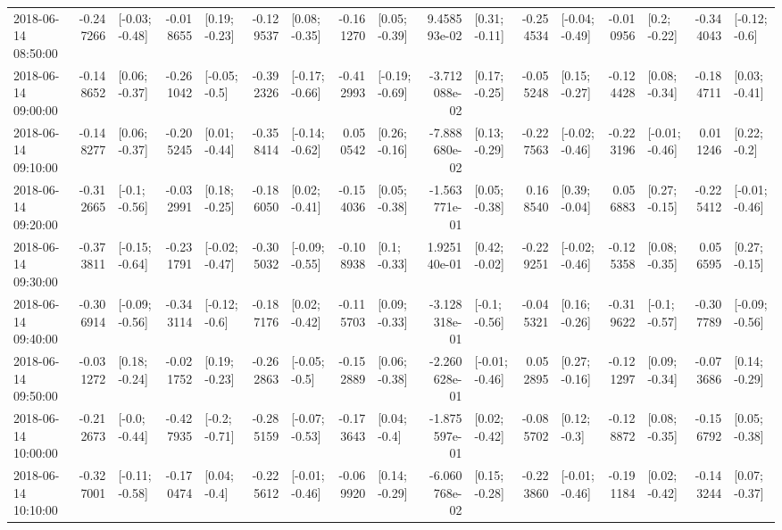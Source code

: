 \begin{tabular}{lrlrlrlrlrlrlrlrl}
2018-06-14 08:50:00 & -0.247266 &  [-0.03; -0.48] & -0.018655 &   [0.19; -0.23] & -0.129537 &   [0.08; -0.35] & -0.161270 &   [0.05; -0.39] &  9.458593e-02 &   [0.31; -0.11] & -0.254534 &  [-0.04; -0.49] & -0.010956 &    [0.2; -0.22] & -0.344043 &   [-0.12; -0.6] \\
2018-06-14 09:00:00 & -0.148652 &   [0.06; -0.37] & -0.261042 &   [-0.05; -0.5] & -0.392326 &  [-0.17; -0.66] & -0.412993 &  [-0.19; -0.69] & -3.712088e-02 &   [0.17; -0.25] & -0.055248 &   [0.15; -0.27] & -0.124428 &   [0.08; -0.34] & -0.184711 &   [0.03; -0.41] \\
2018-06-14 09:10:00 & -0.148277 &   [0.06; -0.37] & -0.205245 &   [0.01; -0.44] & -0.358414 &  [-0.14; -0.62] &  0.050542 &   [0.26; -0.16] & -7.888680e-02 &   [0.13; -0.29] & -0.227563 &  [-0.02; -0.46] & -0.223196 &  [-0.01; -0.46] &  0.011246 &    [0.22; -0.2] \\
2018-06-14 09:20:00 & -0.312665 &   [-0.1; -0.56] & -0.032991 &   [0.18; -0.25] & -0.186050 &   [0.02; -0.41] & -0.154036 &   [0.05; -0.38] & -1.563771e-01 &   [0.05; -0.38] &  0.168540 &   [0.39; -0.04] &  0.056883 &   [0.27; -0.15] & -0.225412 &  [-0.01; -0.46] \\
2018-06-14 09:30:00 & -0.373811 &  [-0.15; -0.64] & -0.231791 &  [-0.02; -0.47] & -0.305032 &  [-0.09; -0.55] & -0.108938 &    [0.1; -0.33] &  1.925140e-01 &   [0.42; -0.02] & -0.229251 &  [-0.02; -0.46] & -0.125358 &   [0.08; -0.35] &  0.056595 &   [0.27; -0.15] \\
2018-06-14 09:40:00 & -0.306914 &  [-0.09; -0.56] & -0.343114 &   [-0.12; -0.6] & -0.187176 &   [0.02; -0.42] & -0.115703 &   [0.09; -0.33] & -3.128318e-01 &   [-0.1; -0.56] & -0.045321 &   [0.16; -0.26] & -0.319622 &   [-0.1; -0.57] & -0.307789 &  [-0.09; -0.56] \\
2018-06-14 09:50:00 & -0.031272 &   [0.18; -0.24] & -0.021752 &   [0.19; -0.23] & -0.262863 &   [-0.05; -0.5] & -0.152889 &   [0.06; -0.38] & -2.260628e-01 &  [-0.01; -0.46] &  0.052895 &   [0.27; -0.16] & -0.121297 &   [0.09; -0.34] & -0.073686 &   [0.14; -0.29] \\
2018-06-14 10:00:00 & -0.212673 &   [-0.0; -0.44] & -0.427935 &   [-0.2; -0.71] & -0.285159 &  [-0.07; -0.53] & -0.173643 &    [0.04; -0.4] & -1.875597e-01 &   [0.02; -0.42] & -0.085702 &    [0.12; -0.3] & -0.128872 &   [0.08; -0.35] & -0.156792 &   [0.05; -0.38] \\
2018-06-14 10:10:00 & -0.327001 &  [-0.11; -0.58] & -0.170474 &    [0.04; -0.4] & -0.225612 &  [-0.01; -0.46] & -0.069920 &   [0.14; -0.29] & -6.060768e-02 &   [0.15; -0.28] & -0.223860 &  [-0.01; -0.46] & -0.191184 &   [0.02; -0.42] & -0.143244 &   [0.07; -0.37] \\

\end{tabular}
